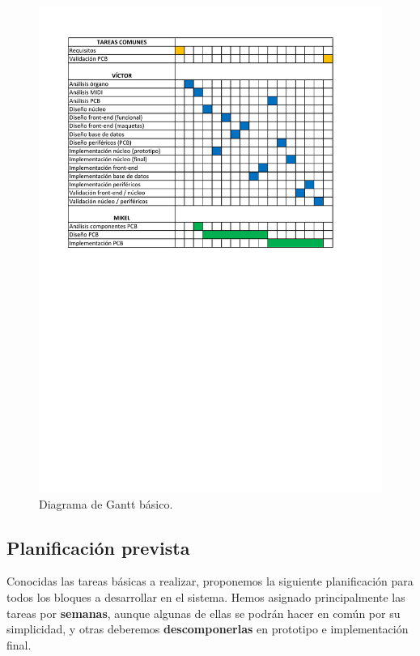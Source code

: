 \begin{figure}[H]
	\noindent \begin{centering}
		\includegraphics[clip=true,trim=50 420 50 50,width=\linewidth*3/4]{capitulo5/plan_gantt}
		\par\end{centering}
	\smallskip
	\caption{\label{fig:plan_gantt} Diagrama de Gantt básico.}
\end{figure} 

\smallskip

\subsection{Planificación prevista}

Conocidas las tareas básicas a realizar, proponemos la siguiente planificación para todos los bloques a desarrollar en el sistema. Hemos asignado principalmente las tareas por \textbf{semanas}, aunque algunas de ellas se podrán hacer en común por su simplicidad, y otras deberemos \textbf{descomponerlas} en prototipo e implementación final.

